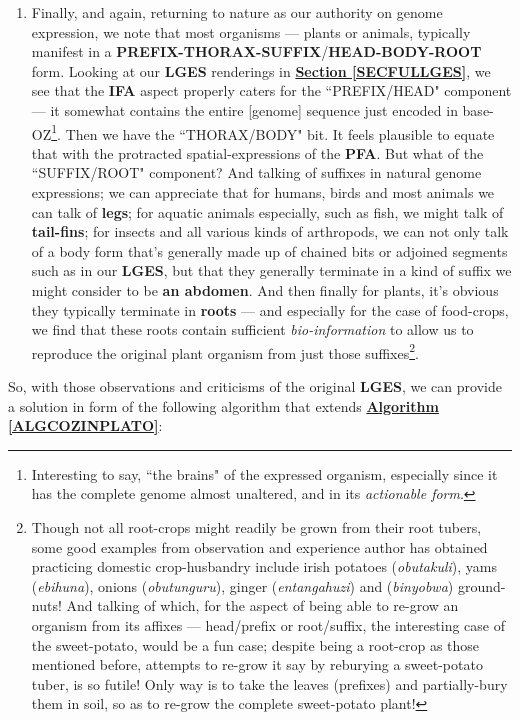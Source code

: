 \documentclass[a4paper, 18pt]{book} %
\begin{document}
\begin{enumerate}
\item Finally, and again, returning to nature as our authority on genome expression, we note that most organisms --- plants or animals, typically manifest in a \textbf{PREFIX-THORAX-SUFFIX}/\textbf{HEAD-BODY-ROOT} form. Looking at our \textbf{LGES} renderings in \textbf{\hyperref[SECFULLGES]{Section \ref{SECFULLGES}}}, we see that the \textbf{IFA} aspect properly caters for the ``PREFIX/HEAD" component --- it somewhat contains the entire [genome] sequence just encoded in base-OZ\footnote{Interesting to say, ``the brains" of the expressed organism, especially since it has the complete genome almost unaltered, and in its \textit{actionable form}.}. Then we have the ``THORAX/BODY" bit. It feels plausible to equate that with the protracted spatial-expressions of the \textbf{PFA}. But what of the ``SUFFIX/ROOT" component? And talking of suffixes in natural genome expressions; we can appreciate that for humans, birds and most animals we can talk of \textbf{legs}; for aquatic animals especially, such as fish, we might talk of \textbf{tail-fins}; for insects and all various kinds of arthropods, we can not only talk of a body form that's generally made up of chained bits or adjoined segments such as in our \textbf{LGES}, but that they generally terminate in a kind of suffix we might consider to be \textbf{an abdomen}. And then finally for plants, it's obvious they typically terminate in \textbf{roots} --- and especially for the case of food-crops, we find that these roots contain sufficient \textit{bio-information} to allow us to reproduce the original plant organism from just those suffixes\footnote{Though not all root-crops might readily be grown from their root tubers, some good examples from observation and experience author has obtained practicing domestic crop-husbandry include irish potatoes (\textit{obutakuli}), yams (\textit{ebihuna}), onions (\textit{obutunguru}), ginger (\textit{entangahuzi}) and (\textit{binyobwa}) ground-nuts! And talking of which, for the aspect of being able to re-grow an organism from its affixes --- head/prefix or root/suffix, the interesting case of the sweet-potato, would be a fun case; despite being a root-crop as those mentioned before, attempts to re-grow it say by reburying a sweet-potato tuber, is so futile! Only way is to take the leaves (prefixes) and partially-bury them in soil, so as to re-grow the complete sweet-potato plant!}.
\end{enumerate}

So, with those observations and criticisms of the original \textbf{LGES}, we can provide a solution in form of the following algorithm that extends \textbf{\hyperref[ALGCOZINPLATO]{Algorithm \ref{ALGCOZINPLATO}}}:
\end{document}
